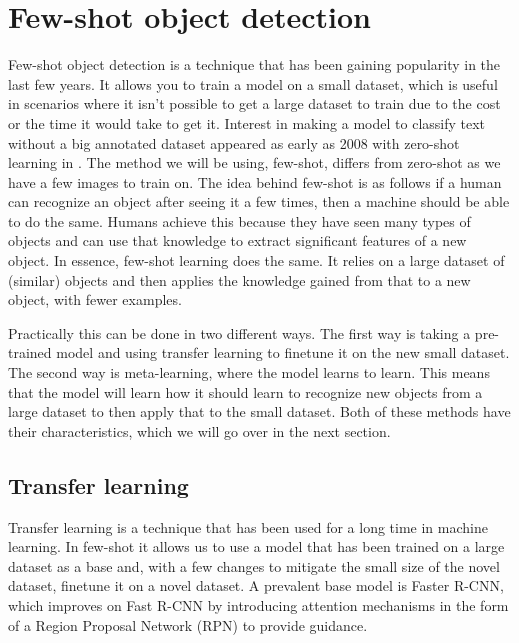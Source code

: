

\section{Few-shot object detection}
Few-shot object detection is a technique that has been gaining popularity in the last few years. It allows you to train a model on a small dataset, which is useful in scenarios where it isn't possible to get a large dataset to train due to the cost or the time it would take to get it. Interest in making a model to classify text without a big annotated dataset appeared as early as 2008 with zero-shot learning in \citet{aaai08-132}. The method we will be using, few-shot, differs from zero-shot as we have a few images to train on. The idea behind few-shot is as follows if a human can recognize an object after seeing it a few times, then a machine should be able to do the same. Humans achieve this because they have seen many types of objects and can use that knowledge to extract significant features of a new object\cite{biederman1987recognition}. In essence, few-shot learning does the same. It relies on a large dataset of (similar) objects and then applies the knowledge gained from that to a new object, with fewer examples.

Practically this can be done in two different ways. The first way is taking a pre-trained model and using transfer learning to finetune it on the new small dataset. The second way is meta-learning, where the model learns to learn. This means that the model will learn how it should learn to recognize new objects from a large dataset to then apply that to the small dataset. Both of these methods have their characteristics, which we will go over in the next section.

\subsection{Transfer learning}
Transfer learning is a technique that has been used for a long time in machine learning. In few-shot it allows us to use a model that has been trained on a large dataset as a base and, with a few changes to mitigate the small size of the novel dataset, finetune it on a novel dataset. A prevalent base model is Faster R-CNN\cite{fasterrcnn}, which improves on Fast R-CNN\cite{fastrcnn} by introducing attention mechanisms in the form of a Region Proposal Network (RPN) to provide guidance.

